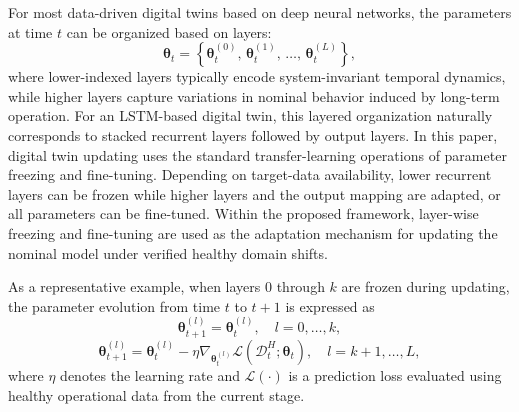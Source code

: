 \documentclass[a4paper,10pt]{cas-sc}%
\newcommand{\rev}[1]{#1}
\newcommand{\roundtworev}[1]{\textcolor{roundtwored}{#1}}
\begin{document}
For most data-driven digital twins based on deep neural networks, the parameters at time $t$ can be organized based on layers:
\begin{equation}
	\boldsymbol{\theta}_t
	=
	\left\{
	\boldsymbol{\theta}_t^{(0)},\,
	\boldsymbol{\theta}_t^{(1)},\,
	\dots,\,
	\boldsymbol{\theta}_t^{(L)}
	\right\},
\end{equation}
where lower-indexed layers typically encode system-invariant temporal dynamics, while higher layers capture variations in nominal behavior induced by long-term operation. For an LSTM-based digital twin, this layered organization naturally corresponds to stacked recurrent layers followed by output layers.
\rev{In this paper, digital twin updating uses the standard transfer-learning operations of parameter freezing and fine-tuning. Depending on target-data availability, lower recurrent layers can be frozen while higher layers and the output mapping are adapted, or all parameters can be fine-tuned. \roundtworev{Within the proposed framework, layer-wise freezing and fine-tuning are used as the adaptation mechanism for updating the nominal model under verified healthy domain shifts.}}

As a representative example, \roundtworev{when layers $0$ through $k$ are frozen during updating}, the parameter evolution from time $t$ to $t+1$ is expressed as
\begin{equation}
	\boldsymbol{\theta}_{t+1}^{(l)} = \boldsymbol{\theta}_{t}^{(l)},
	\quad l = 0, \dots, k,
\end{equation}
\begin{equation}
	\boldsymbol{\theta}_{t+1}^{(l)}
	=
	\boldsymbol{\theta}_{t}^{(l)}
	-
	\eta
	\nabla_{\boldsymbol{\theta}_{t}^{(l)}}
	\mathcal{L}\!\left(\mathcal{D}_t^{H}; \boldsymbol{\theta}_{t}\right),
	\quad l = k+1, \dots, L,
\end{equation}
where $\eta$ denotes the learning rate and $\mathcal{L}(\cdot)$ is a prediction loss evaluated using healthy operational data from the current stage.
\end{document}
